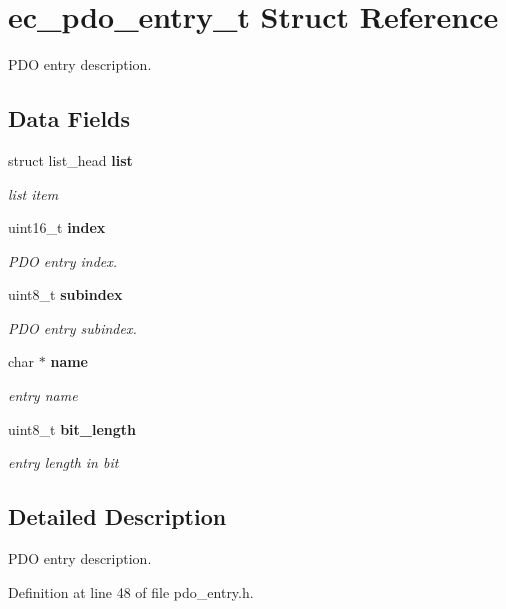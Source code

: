 \section{ec\-\_\-pdo\-\_\-entry\-\_\-t \-Struct \-Reference}
\label{structec__pdo__entry__t}


\-P\-D\-O entry description.  


\subsection*{\-Data \-Fields}
\begin{DoxyCompactItemize}
\item 
struct list\-\_\-head {\bf list}\label{structec__pdo__entry__t_a0d810c566b51deaff1d6de9c59230ae4}

\begin{DoxyCompactList}\small\item\em list item \end{DoxyCompactList}\item 
uint16\-\_\-t {\bf index}\label{structec__pdo__entry__t_aede0b110f1a6f0e0df05081c85b14bf0}

\begin{DoxyCompactList}\small\item\em \-P\-D\-O entry index. \end{DoxyCompactList}\item 
uint8\-\_\-t {\bf subindex}\label{structec__pdo__entry__t_a959b16d415fbbb08a4997d858465a3be}

\begin{DoxyCompactList}\small\item\em \-P\-D\-O entry subindex. \end{DoxyCompactList}\item 
char $\ast$ {\bf name}\label{structec__pdo__entry__t_ac3ccd6c6e8f8dfa934737dd18f456ee5}

\begin{DoxyCompactList}\small\item\em entry name \end{DoxyCompactList}\item 
uint8\-\_\-t {\bf bit\-\_\-length}\label{structec__pdo__entry__t_a589e58c4f0eb47d8916a3da125d09176}

\begin{DoxyCompactList}\small\item\em entry length in bit \end{DoxyCompactList}\end{DoxyCompactItemize}


\subsection{\-Detailed \-Description}
\-P\-D\-O entry description. 

\-Definition at line 48 of file pdo\-\_\-entry.\-h.

